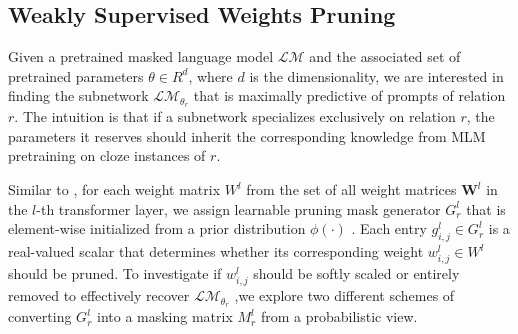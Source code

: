 \label{sec:prompts}
\subsection{Weakly Supervised Weights Pruning}
\label{sec:pruning}

Given a pretrained masked language model $\mathcal{LM}$ and the associated set of pretrained parameters $\theta\in R^d$, where $d$ is the dimensionality, 
we are interested in finding the subnetwork $\mathcal{LM}_{\theta_r}$ 
that is maximally predictive of prompts of relation $r$. The intuition is that if a subnetwork specializes exclusively on relation $r$, the parameters it reserves should inherit the corresponding knowledge from MLM pretraining on cloze instances of $r$. 

Similar to \citet{Zhao2020}, for each weight matrix $W^l$ from the set of all weight matrices $\bm{W}^l$ in the $l$-th transformer layer, we assign 
learnable pruning mask generator $G_r^l$ 
that is element-wise initialized from a prior distribution $\phi(\cdot)$ . 
Each entry $g_{i,j}^l\in G_r^l$ is a real-valued scalar that determines whether its corresponding weight $w_{i,j}^l\in W^l$ should be pruned. To investigate if $w_{i,j}^l$ should be softly scaled or entirely removed to effectively recover  $\mathcal{LM}_{\theta_r}$ ,we explore two different schemes of converting $G_r^l$ into a masking matrix $M_r^l$ from a probabilistic view. 

